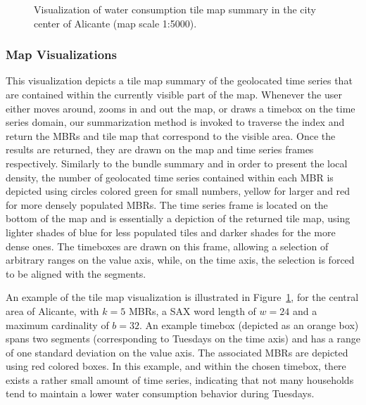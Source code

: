 \begin{figure}[!ht]
 \centering
 \caption{Visualization of water consumption tile map summary in the city center of Alicante (map scale 1:5000).}
 \label{fig:alicante_example2}
\end{figure}

\subsubsection{Map Visualizations}
\label{subsubsec:tilemap_sum_vis}
This visualization depicts a tile map summary of the geolocated time series that are contained within the currently visible part of the map. Whenever the user either moves around, zooms in and out the map, or draws a timebox on the time series domain, our summarization method is invoked to traverse the \hisax index and return the MBRs and tile map that correspond to the visible area. Once the results are returned, they are drawn on the map and time series frames respectively. Similarly to the bundle summary and in order to present the local density, the number of geolocated time series contained within each MBR is depicted using circles colored green for small numbers, yellow for larger and red for more densely populated MBRs. The time series frame is located on the bottom of the map and is essentially a depiction of the returned tile map, using lighter shades of blue for less populated tiles and darker shades for the more dense ones. The timeboxes are drawn on this frame, allowing a selection of arbitrary ranges on the value axis, while, on the time axis, the selection is forced to be aligned with the \isax segments.

An example of the tile map visualization is illustrated in Figure~\ref{fig:alicante_example2}, for the central area of Alicante, with $k=5$ MBRs, a SAX word length of $w=24$ and a maximum cardinality of $b=32$. An example timebox (depicted as an orange box) spans two \isax segments (corresponding to Tuesdays on the time axis) and has a range of one standard deviation on the value axis. The associated MBRs are depicted using red colored boxes. In this example, and within the chosen timebox, there exists a rather small amount of time series, indicating that not many households tend to maintain a lower water consumption behavior during Tuesdays.

